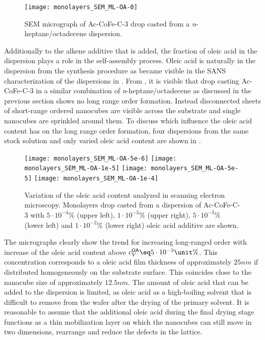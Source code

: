 \documentclass[\main/dresen_thesis.tex]{subfiles}
\begin{document}
  \begin{figure}[!htbp]
    \centering
    \texttt{[image: monolayers\_SEM\_ML-OA-0]}
    \caption{\label{fig:monolayers:preparation:solventVariation:NoOAAddend}SEM micrograph of Ac-CoFe-C-3 drop casted from a \textit{n}-heptane/octadecene dispersion.}
  \end{figure}

  Additionally to the alkene additive that is added, the fraction of oleic acid in the dispersion plays a role in the self-assembly process.
  Oleic acid is naturally in the dispersion from the synthesis procedure as became visible in the SANS characterization of the dispersions in .
  From , it is visible that drop casting Ac-CoFe-C-3 in a similar combination of \textit{n}-heptane/octadecene as discussed in the previous section shows no long range order formation.
  Instead disconnected sheets of short-range ordered nanocubes are visible across the substrate and single nanocubes are sprinkled around them.
  To discuss which influence the oleic acid content has on the long range order formation, four dispersions from the same stock solution and only varied oleic acid content are shown in .

  \begin{figure}[tb]
    \centering
    \texttt{[image: monolayers\_SEM\_ML-OA-5e-6]}
    \texttt{[image: monolayers\_SEM\_ML-OA-1e-5]}
    \texttt{[image: monolayers\_SEM\_ML-OA-5e-5]}
    \texttt{[image: monolayers\_SEM\_ML-OA-1e-4]}
    \caption{\label{fig:monolayers:preparation:solventVariation:OAAddend}Variation of the oleic acid content analyzed in scanning electron microscopy. Monolayers drop casted from a dispersion of Ac-CoFe-C-3 with $5\cdot10^{-4} \unit{\%}$ (upper left), $1\cdot10^{-3} \unit{\%}$ (upper right), $5\cdot10^{-3} \unit{\%}$ (lower left) and $1\cdot10^{-2} \unit{\%}$ (lower right) oleic acid additive are shown.}
  \end{figure}

  The micrographs clearly show the trend for increasing long-ranged order with increase of the oleic acid content above $c_V^\textsf{OA} \eq 5\cdot10^{-3} \unit{\%}$.
  This concentration corresponds to a oleic acid film thickness of approximately $25 \unit{nm}$ if distributed homogeneously on the substrate surface.
  This coincides close to the nanocube size of approximately $12.5 \unit{nm}$.
  The amount of oleic acid that can be added to the dispersion is limited, as oleic acid as a high-boiling solvent that is difficult to remove from the wafer after the drying of the primary solvent.
  It is reasonable to assume that the additional oleic acid during the final drying stage functions as a thin mobilization layer on which the nanocubes can still move in two dimensions, rearrange and reduce the defects in the lattice.
\end{document}
